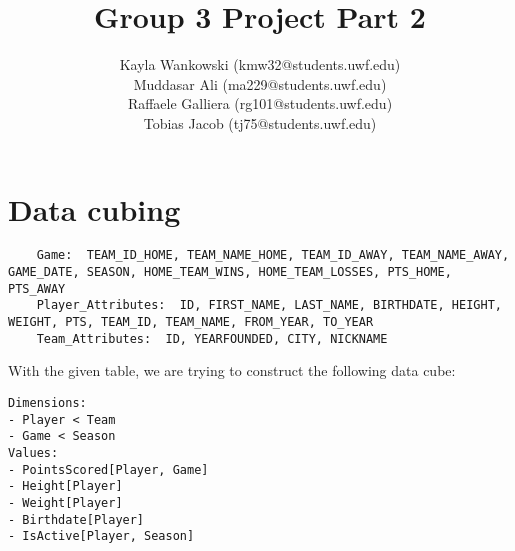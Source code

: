 \documentclass{article}
\begin{document}
\title{Group 3 Project Part 2}
\author{
    Kayla Wankowski (kmw32@students.uwf.edu)\\
    Muddasar Ali (ma229@students.uwf.edu)\\
    Raffaele Galliera (rg101@students.uwf.edu)\\
    Tobias Jacob (tj75@students.uwf.edu)
}

\maketitle

\section{Data cubing}

\begin{lstlisting}
    Game:  TEAM_ID_HOME, TEAM_NAME_HOME, TEAM_ID_AWAY, TEAM_NAME_AWAY, GAME_DATE, SEASON, HOME_TEAM_WINS, HOME_TEAM_LOSSES, PTS_HOME, PTS_AWAY 
    Player_Attributes:  ID, FIRST_NAME, LAST_NAME, BIRTHDATE, HEIGHT, WEIGHT, PTS, TEAM_ID, TEAM_NAME, FROM_YEAR, TO_YEAR 
    Team_Attributes:  ID, YEARFOUNDED, CITY, NICKNAME 
\end{lstlisting}
    
With the given table, we are trying to construct the following data cube:

\begin{lstlisting}
Dimensions:
- Player < Team
- Game < Season
Values:
- PointsScored[Player, Game]
- Height[Player]
- Weight[Player]
- Birthdate[Player]
- IsActive[Player, Season]
\end{lstlisting}
\end{document}
